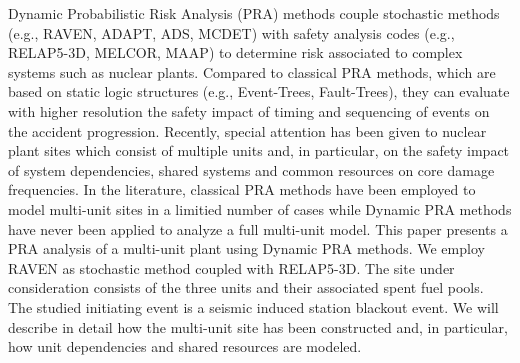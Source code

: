 Dynamic Probabilistic Risk Analysis (PRA) methods couple stochastic methods 
(e.g., RAVEN, ADAPT, ADS, MCDET) with safety analysis codes (e.g., RELAP5-3D, 
MELCOR, MAAP) to determine risk associated to complex systems such as nuclear 
plants. Compared to classical PRA methods, which are based on static logic 
structures (e.g., Event-Trees, Fault-Trees), they can evaluate with higher 
resolution the safety impact of timing and sequencing of events on the 
accident progression. 
Recently, special attention has been given to nuclear 
plant sites which consist of multiple units and, in particular, on the safety 
impact of system dependencies, shared systems and common resources on core 
damage frequencies. 
In the literature, classical PRA methods have been employed to model multi-unit 
sites in a limitied number of cases while Dynamic PRA methods have never been 
applied to analyze a full multi-unit model. 
This paper presents a PRA analysis of a multi-unit plant using Dynamic PRA methods. 
We employ RAVEN as stochastic method coupled with RELAP5-3D. 
The site under consideration consists of the three units and their associated 
spent fuel pools. The studied initiating
event is a seismic induced station blackout event. We will describe in detail 
how the multi-unit site has been constructed and, in particular, how unit 
dependencies and shared resources are modeled.